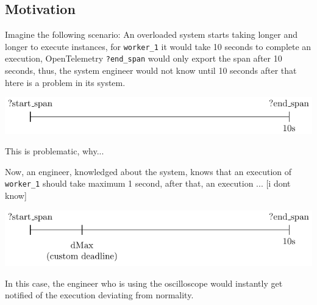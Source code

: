 \subsection{Motivation}
    Imagine the following scenario: An overloaded system starts taking longer and longer to execute instances, for \texttt{worker\_1} it would take 10 seconds to complete an execution, OpenTelemetry \texttt{?end\_span} would only export the span after 10 seconds, thus, the system engineer would not know until 10 seconds after that htere is a problem in its system.
    \begin{center}
        \includegraphics[width=\textwidth, scale = 0.8]{tikz/start_end.pdf}
    \end{center}
    This is problematic, why...

    Now, an engineer, knowledged about the system, knows that an execution of \texttt{worker\_1} should take maximum 1 second, after that, an execution ... [i dont know]
    \begin{center}
        \includegraphics[width=\textwidth, scale = 0.8]{tikz/start_end_dmax.pdf}
    \end{center}
    In this case, the engineer who is using the oscilloscope would instantly get notified of the execution deviating from normality.


